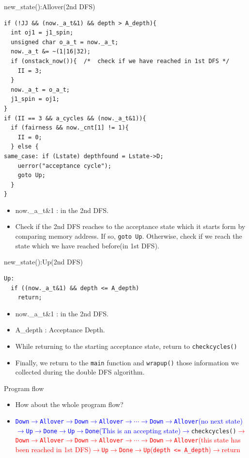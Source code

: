 \documentclass[12pt]{beamer}
\newcommand{\code}[1]{\texttt{#1}}
\begin{document}
\begin{frame}[fragile]{new\_state():Allover(2nd DFS)}
\begin{lstlisting}[basicstyle=\footnotesize\ttfamily]
if (!JJ && (now._a_t&1) && depth > A_depth){
  int oj1 = j1_spin;
  unsigned char o_a_t = now._a_t;
  now._a_t &= ~(1|16|32);
  if (onstack_now()){  /*  check if we have reached in 1st DFS */
    II = 3;
  }
  now._a_t = o_a_t;
  j1_spin = oj1;
}
if (II == 3 && a_cycles && (now._a_t&1)){
  if (fairness && now._cnt[1] != 1){
    II = 0;
  } else {
same_case: if (Lstate) depthfound = Lstate->D;
    uerror("acceptance cycle");
    goto Up;
  }
}
\end{lstlisting}
\begin{itemize}
	\item now.\_a\_t\&1 : in the 2nd DFS.
	\item Check if the 2nd DFS reaches to the acceptance state which it starts form by comparing memory address. If so, \code{goto Up}. Otherwise, check if we reach the state which we have reached before(in 1st DFS).
\end{itemize}
\end{frame}

\begin{frame}[fragile]{new\_state():Up(2nd DFS)}
\begin{lstlisting}[basicstyle=\footnotesize\ttfamily]
Up:
  if ((now._a_t&1) && depth <= A_depth)
    return;
\end{lstlisting}
\begin{itemize}
	\item now.\_a\_t\&1 : in the 2nd DFS.
	\item A\_depth : Acceptance Depth.
	\item While returning to the starting acceptance state, return to \code{checkcycles()}
	\item Finally, we return to the \code{main} function and \code{wrapup()} those information we collected during the double DFS algorithm.
\end{itemize}
\end{frame}

\begin{frame}[fragile]{Program flow}
\begin{itemize}
	\item How about the whole program flow?
	\item 
	\textcolor{blue}{\code{Down}$\rightarrow$\code{Allover}$\rightarrow$\code{Down}$\rightarrow$\code{Allover}$\rightarrow\cdots\rightarrow$\code{Down}$\rightarrow$\code{Allover}(no next state)$\rightarrow$\code{Up}$\rightarrow$\code{Done}$\rightarrow$\code{Up}$\rightarrow$\code{Done}(This is an accepting state)$\rightarrow$}\code{checkcycles()}\textcolor{red}{$\rightarrow$\code{Down}$\rightarrow$\code{Allover}$\rightarrow$\code{Down}$\rightarrow$\code{Allover}$\rightarrow\cdots\rightarrow$\code{Down}$\rightarrow$\code{Allover}(this state has been reached in 1st DFS)$\rightarrow$\code{Up}$\rightarrow$\code{Done}$\rightarrow$\code{Up}(\code{depth <= A\_depth})$\rightarrow$return}
\end{itemize}
\end{frame}
\end{document}
